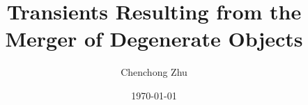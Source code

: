 \documentclass[12pt,preprint]{aastex}
\begin{document}
\title{Transients Resulting from the Merger of Degenerate Objects}

\author{Chenchong Zhu}

\date{\today}







\end{document}
